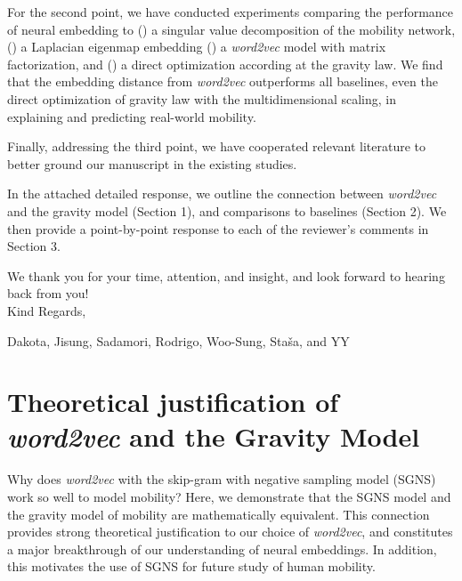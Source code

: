 \documentclass[12pt,a4paper]{article}
\newcounter{comment}[subsection]
\begin{document}
For the second point, we have conducted experiments comparing the performance of neural embedding to () a singular value decomposition of the mobility network,  () a Laplacian eigenmap embedding  () a \textit{word2vec} model with matrix factorization,  and  () a direct optimization according at the gravity law. We find that the embedding distance from \textit{word2vec} outperforms all baselines, even the direct optimization of gravity law with the multidimensional scaling, in explaining and predicting real-world mobility.

Finally, addressing the third point, we have cooperated relevant literature to better ground our manuscript in the existing studies.

In the attached detailed response, we outline the connection between \textit{word2vec} and the gravity model (Section 1), and comparisons to baselines (Section 2). We then provide a point-by-point response to each of the reviewer's comments in Section 3.

We thank you for your time, attention, and insight, and look forward to hearing back from you!\\

Kind Regards,

Dakota, Jisung, Sadamori, Rodrigo, Woo-Sung, Staša, and YY

\clearpage
{}
\setcounter{page}{1}
\tableofcontents
\clearpage


\section{Theoretical justification of \textit{word2vec} and the Gravity Model}
\label{sec:theory}
Why does \textit{word2vec} with the skip-gram with negative sampling model (SGNS) work so well to model mobility?
Here, we demonstrate that the SGNS model and the gravity model of mobility are mathematically equivalent.
This connection provides strong theoretical justification to our choice of \textit{word2vec}, and constitutes a major breakthrough of our understanding of neural embeddings.
In addition, this motivates the use of SGNS for future study of human mobility.
\end{document}
